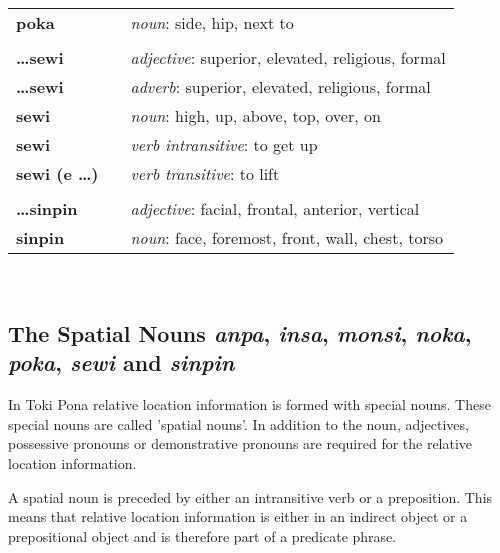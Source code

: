 \begin{supertabular}{p{2,5cm}|ll}
\textbf{poka} && \textit{noun}: side, hip, next to \\ %
 && \\ %
%
\textbf{\dots sewi} && \textit{adjective}: superior, elevated, religious, formal \\ %
\textbf{\dots sewi} && \textit{adverb}: superior, elevated, religious, formal \\ %
\textbf{sewi} && \textit{noun}: high, up, above, top, over, on \\ %
\textbf{sewi} && \textit{verb intransitive}: to get up \\ %
\textbf{sewi (e \dots)} && \textit{verb transitive}: to lift \\ %
 && \\ %
%
\textbf{\dots sinpin} && \textit{adjective}: facial, frontal, anterior, vertical \\ %
\textbf{sinpin} && \textit{noun}: face, foremost, front, wall, chest, torso \\ %
\end{supertabular} \\
%
%
\newpage
%
\subsection*{The Spatial Nouns \textit{anpa}, \textit{insa}, \textit{monsi}, \textit{noka}, \textit{poka}, \textit{sewi} and \textit{sinpin}}
%
%

In Toki Pona relative location information is formed with special nouns. 
These special nouns are called 'spatial nouns'. 
In addition to the noun, adjectives, possessive pronouns or demonstrative pronouns are required for the relative location information. 

A spatial noun is preceded by either an intransitive verb or a preposition. 
This means that relative location information is either in an indirect object or a prepositional object and is therefore part of a predicate phrase.


